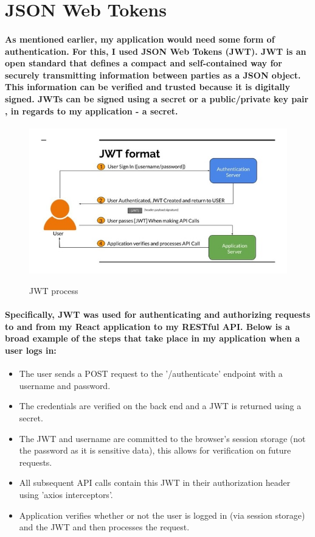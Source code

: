 \section{JSON Web Tokens}
\paragraph{As mentioned earlier, my application would need some form of authentication. For this, I used JSON Web Tokens (JWT). JWT is an open standard that defines a compact and self-contained way for securely transmitting information between parties as a JSON object. This information can be verified and trusted because it is digitally signed. JWTs can be signed using a secret or a public/private key pair \cite{JWT}, in regards to my application - a secret.}
\begin{figure}[ht]
    \centering
    \includegraphics[scale=0.4]{Images/jwt1.jpeg} 
    \label{jwt1_label}
    \caption{JWT process}
\end{figure}
\paragraph{Specifically, JWT was used for authenticating and authorizing requests to and from my React application to my RESTful API. Below is a broad example of the steps that take place in my application when a user logs in:}
\begin{itemize}
    \item The user sends a POST request to the '/authenticate' endpoint with a username and password. 
    \item The credentials are verified on the back end and a JWT is returned using a secret.
    \item The JWT and username are committed to the browser's session storage (not the password as it is sensitive data), this allows for verification on future requests.
    \item All subsequent API calls contain this JWT in their  authorization header using 'axios interceptors'.
    \item Application verifies whether or not the user is logged in (via session storage) and the JWT and then processes the request.
\end{itemize}


